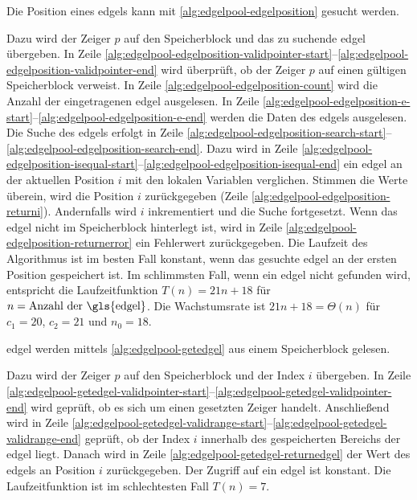Die Position eines \glspl{edgel} kann mit \autoref{alg:edgelpool-edgelposition} gesucht werden.

Dazu wird der Zeiger $p$ auf den Speicherblock und das zu suchende \gls{edgel} übergeben. In Zeile
 \ref{alg:edgelpool-edgelposition-validpointer-start}--\ref{alg:edgelpool-edgelposition-validpointer-end} wird
 überprüft, ob der Zeiger $p$ auf einen gültigen Speicherblock verweist. In Zeile
 \ref{alg:edgelpool-edgelposition-count} wird die Anzahl der eingetragenen \gls{edgel} ausgelesen. In Zeile
 \ref{alg:edgelpool-edgelposition-e-start}--\ref{alg:edgelpool-edgelposition-e-end} werden die Daten des \glspl{edgel}
 ausgelesen. Die Suche des \glspl{edgel} erfolgt in Zeile
 \ref{alg:edgelpool-edgelposition-search-start}--\ref{alg:edgelpool-edgelposition-search-end}. Dazu wird in Zeile
 \ref{alg:edgelpool-edgelposition-isequal-start}--\ref{alg:edgelpool-edgelposition-isequal-end} ein \gls{edgel} an der
 aktuellen Position $i$ mit den lokalen Variablen verglichen. Stimmen die Werte überein, wird die Position $i$
 zurückgegeben (Zeile \ref{alg:edgelpool-edgelposition-returni}). Andernfalls wird $i$ inkrementiert und die Suche
 fortgesetzt. Wenn das \gls{edgel} nicht im Speicherblock hinterlegt ist, wird in Zeile
 \ref{alg:edgelpool-edgelposition-returnerror} ein Fehlerwert zurückgegeben. Die Laufzeit des Algorithmus ist im besten
 Fall konstant, wenn das gesuchte \gls{edgel} an der ersten Position gespeichert ist. Im schlimmsten Fall, wenn ein
 \gls{edgel} nicht gefunden wird, entspricht die Laufzeitfunktion $T(n) = 21n + 18 $ für
 $n = \text{Anzahl der \gls{edgel}}$. Die Wachstumsrate ist $21n + 18 = \Theta(n)$ für $c_{1}=20$, $c_{2}=21$ und
 $n_{0} = 18$.

\gls{edgel} werden mittels \autoref{alg:edgelpool-getedgel} aus einem Speicherblock gelesen.

Dazu wird der Zeiger $p$ auf den Speicherblock und der Index $i$ übergeben. In Zeile
 \ref{alg:edgelpool-getedgel-validpointer-start}--\ref{alg:edgelpool-getedgel-validpointer-end} wird geprüft, ob es
 sich um einen gesetzten Zeiger handelt. Anschließend wird in Zeile
 \ref{alg:edgelpool-getedgel-validrange-start}--\ref{alg:edgelpool-getedgel-validrange-end} geprüft, ob der Index $i$
 innerhalb des gespeicherten Bereichs der \gls{edgel} liegt. Danach wird in Zeile
 \ref{alg:edgelpool-getedgel-returnedgel} der Wert des \glspl{edgel} an Position $i$ zurückgegeben. Der Zugriff auf
 ein \gls{edgel} ist konstant. Die Laufzeitfunktion ist im schlechtesten Fall $T(n) = 7$.

